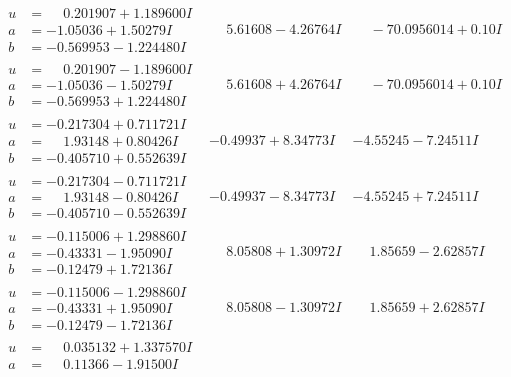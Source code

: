 \documentclass[1p]{elsarticle_modified}
\theoremstyle{definition}
\begin{document}
$$\begin{array}{c|c|c}
\begin{aligned}
u &= \phantom{-}0.201907 + 1.189600 I \\
a &= -1.05036 + 1.50279 I \\
b &= -0.569953 - 1.224480 I\end{aligned}
 & \phantom{-}5.61608 - 4.26764 I & \phantom{-}                 -7
0.0956014 + 0. 10   I\phantom{ +0.000000I} \\ \hline\begin{aligned}
u &= \phantom{-}0.201907 - 1.189600 I \\
a &= -1.05036 - 1.50279 I \\
b &= -0.569953 + 1.224480 I\end{aligned}
 & \phantom{-}5.61608 + 4.26764 I & \phantom{-}                 -7
0.0956014 + 0. 10   I\phantom{ +0.000000I} \\ \hline\begin{aligned}
u &= -0.217304 + 0.711721 I \\
a &= \phantom{-}1.93148 + 0.80426 I \\
b &= -0.405710 + 0.552639 I\end{aligned}
 & -0.49937 + 8.34773 I & -4.55245 - 7.24511 I \\ \hline\begin{aligned}
u &= -0.217304 - 0.711721 I \\
a &= \phantom{-}1.93148 - 0.80426 I \\
b &= -0.405710 - 0.552639 I\end{aligned}
 & -0.49937 - 8.34773 I & -4.55245 + 7.24511 I \\ \hline\begin{aligned}
u &= -0.115006 + 1.298860 I \\
a &= -0.43331 - 1.95090 I \\
b &= -0.12479 + 1.72136 I\end{aligned}
 & \phantom{-}8.05808 + 1.30972 I & \phantom{-}1.85659 - 2.62857 I \\ \hline\begin{aligned}
u &= -0.115006 - 1.298860 I \\
a &= -0.43331 + 1.95090 I \\
b &= -0.12479 - 1.72136 I\end{aligned}
 & \phantom{-}8.05808 - 1.30972 I & \phantom{-}1.85659 + 2.62857 I \\ \hline\begin{aligned}
u &= \phantom{-}0.035132 + 1.337570 I \\
a &= \phantom{-}0.11366 - 1.91500 I \\

\end{aligned}
\end{array}$$
\end{document}
